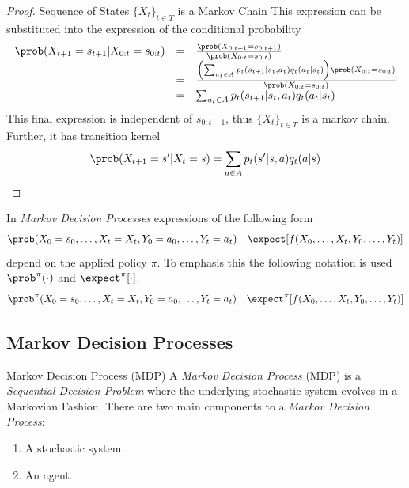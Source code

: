 \documentclass[11pt,a4paper]{article}
\begin{document}
\begin{proof}{Sequence of States $\{X_t\}_{t\in T}$ is a Markov Chain}
    This expression can be substituted into the expression of the conditional probability
    \[\begin{array}{rcl}
      \prob(X_{t+1}=s_{t+1}|X_{0:t}=s_{0:t})&=&\frac{\prob(X_{0:t+1}=s_{0:t+1})}{\prob(X_{0:t}=s_{0:t})}\\
      &=&\frac{\left(\sum_{a_t\in A}p_t(s_{t+1}|s_t,a_t)q_t(a_t|s_t)\right)\prob(X_{0:t}=s_{0:t})}{\prob(X_{0:t}=s_{0:t})}\\
      &=&\sum_{a_t\in A}p_t(s_{t+1}|s_t,a_t)q_t(a_t|s_t)
    \end{array}\]
    This final expression is independent of $s_{0:t-1}$, thus $\{X_t\}_{t\in T}$ is a markov chain. Further, it has transition kernel
    \[ \prob(X_{t+1}=s'|X_t=s)=\sum_{a\in A}p_t(s'|s,a)q_t(a|s) \]
  \end{proof}

  \begin{remark}{}
    In \textit{Markov Decision Processes} expressions of the following form
    \[ \prob(X_0=s_0,\dots,X_t=X_t,Y_0=a_0,\dots,Y_t=a_t)\quad\expect[f(X_0,\dots,X_t,Y_0,\dots,Y_t)] \]
    depend on the applied policy $\pi$. To emphasis this the following notation is used $\prob^\pi(\cdot)$ and $\expect^\pi[\cdot]$.
    \[ \prob^\pi(X_0=s_0,\dots,X_t=X_t,Y_0=a_0,\dots,Y_t=a_t)\quad\expect^\pi[f(X_0,\dots,X_t,Y_0,\dots,Y_t)] \]
  \end{remark}

\subsection{Markov Decision Processes}

  \begin{definition}{Markov Decision Process (MDP)}
    A \textit{Markov Decision Process} (MDP) is a \textit{Sequential Decision Problem} where the underlying stochastic system evolves in a Markovian Fashion. There are two main components to a \textit{Markov Decision Process}:
    \begin{enumerate}
      \item A stochastic system.
      \item An agent.
    \end{enumerate}
  \end{definition}
\end{document}
